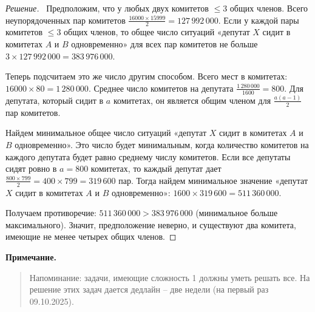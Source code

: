 \documentclass{article}
\begin{document}
\begin{proof}[Решение]\
Предположим, что у любых двух комитетов $\le 3$ общих членов. Всего неупорядоченных пар комитетов $\frac{16000 \times 15999}{2} = 127\,992\,000$. Если у каждой пары комитетов $\le 3$ общих членов, то общее число ситуаций «депутат $X$ сидит в комитетах $A$ и $B$ одновременно» для всех пар комитетов не больше $3 \times 127\,992\,000 = 383\,976\,000$.

Теперь подсчитаем это же число другим способом. Всего мест в комитетах: $16000 \times 80 = 1\,280\,000$. Среднее число комитетов на депутата $ \frac{1\,280\,000}{1600} = 800$. Для депутата, который сидит в $a$ комитетах, он является общим членом для $\frac{a(a-1)}{2}$ пар комитетов. 

Найдем минимальное общее число ситуаций «депутат $X$ сидит в комитетах $A$ и $B$ одновременно». Это число будет минимальным, когда количество комитетов на каждого депутата будет равно среднему числу комитетов. Если все депутаты сидят ровно в $a = 800$ комитетах, то каждый депутат дает $\frac{800 \times 799}{2} = 400 \times 799 = 319\,600$ пар. Тогда найдем минимальное значение «депутат $X$ сидит в комитетах $A$ и $B$ одновременно»: $1600 \times 319\,600 = 511\,360\,000$.

Получаем противоречие: $511\,360\,000 > 383\,976\,000$ (минимальное больше максимального). Значит, предположение неверно, и существуют два комитета, имеющие не менее четырех общих членов. 
\end{proof}

\vspace{1.5em}
\noindent\textbf{Примечание.}
\begin{quote}
Напоминание: задачи, имеющие сложность 1 должны уметь решать все. На решение этих задач дается дедлайн – две недели (на первый раз 09.10.2025).
\end{quote}
\end{document}
